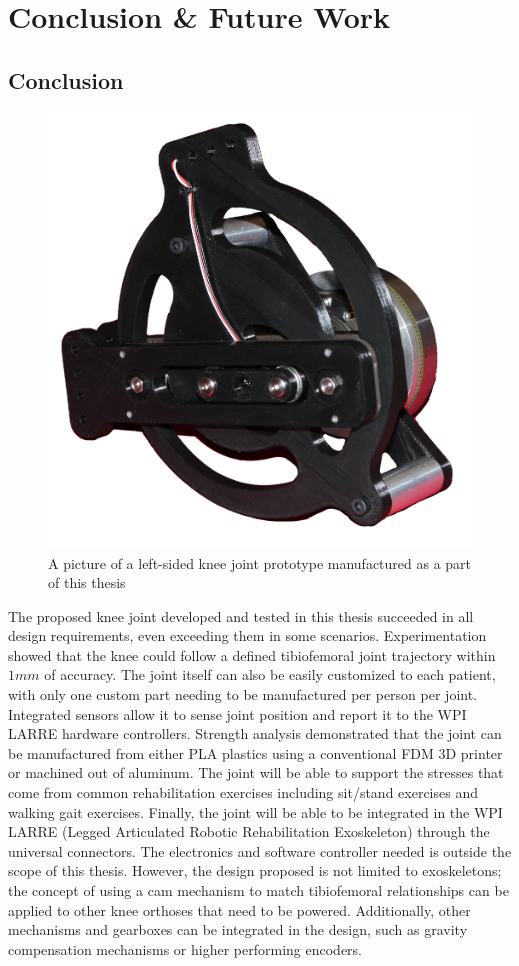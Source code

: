 \chapter{Conclusion \& Future Work}

\section{Conclusion}

\begin{figure}[ht!]
    \centering
    \includegraphics[width=0.7\linewidth]{Figures/KneeJointPrototype_ClearBackground.png}
    \caption{A picture of a left-sided knee joint prototype manufactured as a part of this thesis}
    \label{fig:KneeJointPicture}
\end{figure}

The proposed knee joint developed and tested in this thesis succeeded in all design requirements, even exceeding them in some scenarios. Experimentation showed that the knee could follow a defined tibiofemoral joint trajectory within \(1mm\) of accuracy. The joint itself can also be easily customized to each patient, with only one custom part needing to be manufactured per person per joint. Integrated sensors allow it to sense joint position and report it to the WPI LARRE hardware controllers. Strength analysis demonstrated that the joint can be manufactured from either PLA plastics using a conventional FDM 3D printer or machined out of aluminum. The joint will be able to support the stresses that come from common rehabilitation exercises including sit/stand exercises and walking gait exercises. Finally, the joint will be able to be integrated in the WPI LARRE (Legged Articulated Robotic Rehabilitation Exoskeleton) through the universal connectors. The electronics and software controller needed is outside the scope of this thesis. However, the design proposed is not limited to exoskeletons; the concept of using a cam mechanism to match tibiofemoral relationships can be applied to other knee orthoses that need to be powered. Additionally, other mechanisms and gearboxes can be integrated in the design, such as gravity compensation mechanisms or higher performing encoders.

